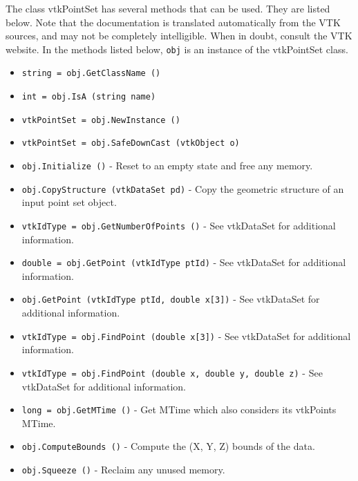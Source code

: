 The class vtkPointSet has several methods that can be used.
  They are listed below.
Note that the documentation is translated automatically from the VTK sources,
and may not be completely intelligible.  When in doubt, consult the VTK website.
In the methods listed below, \verb|obj| is an instance of the vtkPointSet class.
\begin{itemize}
\item  \verb|string = obj.GetClassName ()|

\item  \verb|int = obj.IsA (string name)|

\item  \verb|vtkPointSet = obj.NewInstance ()|

\item  \verb|vtkPointSet = obj.SafeDownCast (vtkObject o)|

\item  \verb|obj.Initialize ()| -  Reset to an empty state and free any memory.

\item  \verb|obj.CopyStructure (vtkDataSet pd)| -  Copy the geometric structure of an input point set object.

\item  \verb|vtkIdType = obj.GetNumberOfPoints ()| -  See vtkDataSet for additional information.

\item  \verb|double = obj.GetPoint (vtkIdType ptId)| -  See vtkDataSet for additional information.

\item  \verb|obj.GetPoint (vtkIdType ptId, double x[3])| -  See vtkDataSet for additional information.

\item  \verb|vtkIdType = obj.FindPoint (double x[3])| -  See vtkDataSet for additional information.

\item  \verb|vtkIdType = obj.FindPoint (double x, double y, double z)| -  See vtkDataSet for additional information.

\item  \verb|long = obj.GetMTime ()| -  Get MTime which also considers its vtkPoints MTime.

\item  \verb|obj.ComputeBounds ()| -  Compute the (X, Y, Z)  bounds of the data.

\item  \verb|obj.Squeeze ()| -  Reclaim any unused memory.


\end{itemize}
